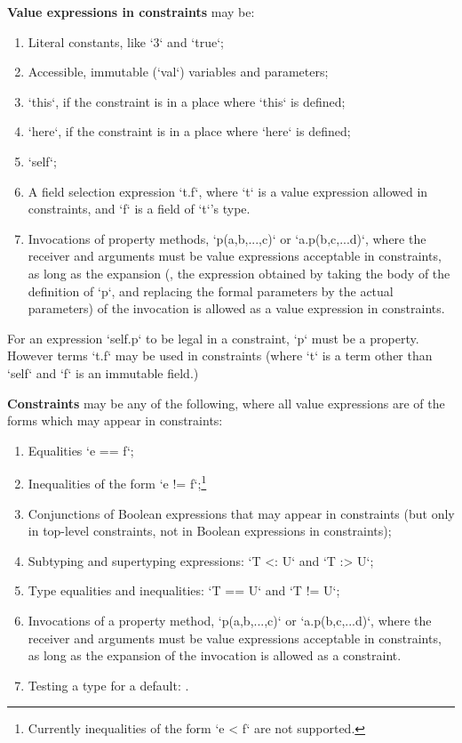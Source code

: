 {\bf Value expressions in constraints} may be: 
\begin{enumerate}
\item Literal constants, like \xcd`3` and \xcd`true`;
\item Accessible, immutable (\xcd`val`) variables and parameters;
\item \xcd`this`, if the constraint is in a place where \xcd`this` is defined;
\item \xcd`here`, if the constraint is in a place where \xcd`here` is defined;
\item \xcd`self`;
\item A field selection expression \xcd`t.f`, where \xcd`t` is a value
      expression allowed in constraints, and \xcd`f` is a field of \xcd`t`'s
      type.    
 \item Invocations of property methods,  \xcd`p(a,b,...,c)` or
      \xcd`a.p(b,c,...d)`, where the receiver and arguments must be
       value expressions acceptable in constraints, as long as the expansion
       (\viz, the expression obtained by taking the body of the definition of
       \xcd`p`, and replacing the formal parameters by the actual parameters)
       of the invocation is allowed as a value expression in constraints.  
\end{enumerate}
For an expression \xcd`self.p` to be legal in a constraint, 
\xcd`p` must be 
a property. However terms \xcd`t.f` may be
used in constraints (where \xcd`t` is a term other than \xcd`self` and
\xcd`f` is an immutable field.)

{\bf Constraints}  may be any of
the following, where 
all value expressions are of the forms which may appear in constraints: 
\begin{enumerate}
\item Equalities \xcd`e == f`;
\item Inequalities of the form \xcd`e != f`;\footnote{Currently inequalities
      of the form \xcd`e < f` are not supported.}
\item Conjunctions of Boolean expressions that may appear in constraints (but
      only in top-level constraints, not in Boolean expressions in constraints);
\item Subtyping and supertyping expressions: \xcd`T <: U` and \xcd`T :> U`; 
\item Type equalities and inequalities: \xcd`T == U` and \xcd`T != U`; 
\item Invocations of a property method, \xcd`p(a,b,...,c)` or
      \xcd`a.p(b,c,...d)`, where the receiver and arguments must be value
      expressions acceptable in constraints, as long as the expansion of the
      invocation is allowed as a constraint.
\item Testing a type for a default: .
\end{enumerate}


